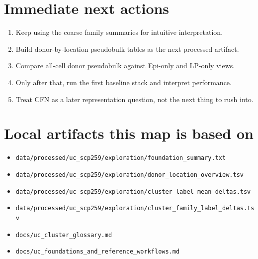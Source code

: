 \documentclass[11pt]{article}
\begin{document}
\section*{Immediate next actions}

\begin{enumerate}
  \item Keep using the coarse family summaries for intuitive interpretation.
  \item Build donor-by-location pseudobulk tables as the next processed artifact.
  \item Compare all-cell donor pseudobulk against Epi-only and LP-only views.
  \item Only after that, run the first baseline stack and interpret performance.
  \item Treat CFN as a later representation question, not the next thing to rush into.
\end{enumerate}

\section*{Local artifacts this map is based on}

\begin{itemize}
  \item \texttt{data/processed/uc\_scp259/exploration/foundation\_summary.txt}
  \item \texttt{data/processed/uc\_scp259/exploration/donor\_location\_overview.tsv}
  \item \texttt{data/processed/uc\_scp259/exploration/cluster\_label\_mean\_deltas.tsv}
  \item \texttt{data/processed/uc\_scp259/exploration/cluster\_family\_label\_deltas.tsv}
  \item \texttt{docs/uc\_cluster\_glossary.md}
  \item \texttt{docs/uc\_foundations\_and\_reference\_workflows.md}
\end{itemize}
\end{document}
